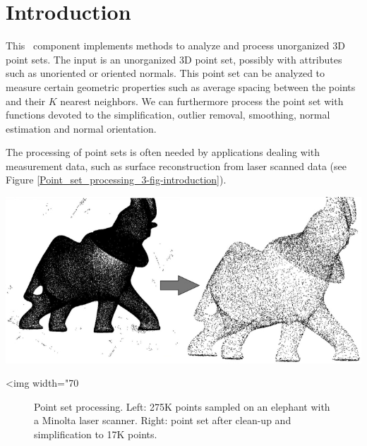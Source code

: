 \section{Introduction}

This \cgal\ component implements methods to analyze and process unorganized 3D point sets. The input is an unorganized 3D point set, possibly with attributes such as unoriented or oriented normals. This point set can be analyzed to measure certain geometric properties such as average spacing between the points and their $K$ nearest neighbors. We can furthermore process the point set with functions devoted to the simplification, outlier removal, smoothing, normal estimation and normal orientation.


The processing of point sets is often needed by applications dealing with measurement data, such as surface reconstruction from laser scanned data (see Figure \ref{Point_set_processing_3-fig-introduction}).


\begin{center}
    \label{Point_set_processing_3-fig-introduction}
    \begin{ccTexOnly}
        \includegraphics[width=1.0\textwidth]{Point_set_processing_3/introduction} %
    \end{ccTexOnly}
    \begin{ccHtmlOnly}
        <img width="70%
    \end{ccHtmlOnly}
    \begin{figure}[h]
        \caption{Point set processing.
                 Left: 275K points sampled on an elephant with
                 a Minolta laser scanner.
                 Right: point set after clean-up and
                 simplification to 17K points.}
    \end{figure}
\end{center}

